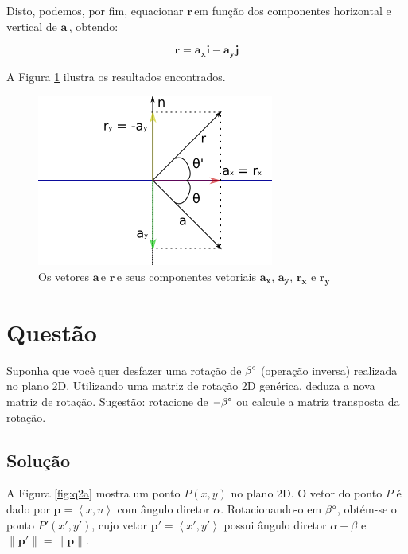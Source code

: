 \documentclass[a4paper,11pt,pagenumber=true]{article}
\newcommand{\veca}{$\mathbf{a\,}$}
\newcommand{\vecr}{$\mathbf{r\,}$}
\newcommand{\vecnorm}[1]{\|\mathbf{#1}\|}
\theoremstyle{mytheor}
\begin{document}
            Disto, podemos, por fim, equacionar \vecr em função dos componentes horizontal e vertical de \veca, obtendo: 
            
            \begin{equation}
                \mathbf{r} = \mathbf{a_x} \mathbf{i} - \mathbf{a_y} \mathbf{j} 
                \label{eq:ra}
            \end{equation}

            A Figura \ref{fig:q1a3} ilustra os resultados encontrados.

            \begin{figure}[h]
            \centering
            \includegraphics{images/Q-1-A-3.png}
                \caption{
                    Os vetores \veca e \vecr e seus componentes vetoriais 
                    $\mathbf{a_x}$, $\mathbf{a_y}$, $\mathbf{r_x}$ e $\mathbf{r_y}$
                }
                \label{fig:q1a3}
            \end{figure}

    \section{Questão }
    
        Suponha que você quer desfazer uma rotação de $\beta\degree$ (operação inversa) realizada no plano 2D. Utilizando uma matriz de rotação 2D genérica, deduza a nova matriz de rotação. Sugestão: rotacione de $-\beta\degree$ ou calcule a matriz transposta da rotação.

        \subsection*{Solução}
            
            A Figura \ref{fig:q2a} mostra um ponto $P(x, y)$ no plano 2D. O vetor do ponto $P$ é dado por $\mathbf{p}=\left<x, u\right>$ com ângulo diretor $\alpha$. Rotacionando-o em $\beta\degree$, obtém-se o ponto $P'(x', y')$, cujo vetor $\mathbf{p'}=\left<x', y'\right>$ possui ângulo diretor $\alpha + \beta$ e $\vecnorm{p'}=\vecnorm{p}$.
            
\end{document}
